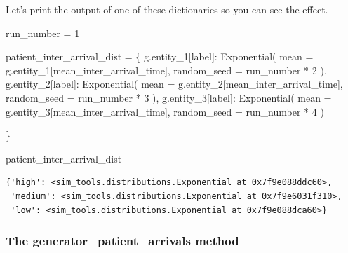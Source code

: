 \documentclass[
  letterpaper,
  DIV=11,
  numbers=noendperiod]{scrreprt}
\newenvironment{Shaded}{}{}
\newcommand{\DecValTok}[1]{\textcolor[rgb]{0.00,0.36,0.77}{#1}}
\newcommand{\NormalTok}[1]{\textcolor[rgb]{0.14,0.16,0.18}{#1}}
\newcommand{\OperatorTok}[1]{\textcolor[rgb]{0.14,0.16,0.18}{#1}}
\newcommand{\StringTok}[1]{\textcolor[rgb]{0.01,0.18,0.38}{#1}}
\begin{document}
Let's print the output of one of these dictionaries so you can see the
effect.

\begin{Shaded}
\begin{Highlighting}[]
\NormalTok{run\_number }\OperatorTok{=} \DecValTok{1}

\NormalTok{patient\_inter\_arrival\_dist }\OperatorTok{=}\NormalTok{ \{}
\NormalTok{            g.entity\_1[}\StringTok{\textquotesingle{}label\textquotesingle{}}\NormalTok{]: Exponential(}
\NormalTok{                mean }\OperatorTok{=}\NormalTok{ g.entity\_1[}\StringTok{\textquotesingle{}mean\_inter\_arrival\_time\textquotesingle{}}\NormalTok{],}
\NormalTok{                random\_seed }\OperatorTok{=}\NormalTok{ run\_number }\OperatorTok{*} \DecValTok{2}
\NormalTok{                ),}
\NormalTok{            g.entity\_2[}\StringTok{\textquotesingle{}label\textquotesingle{}}\NormalTok{]: Exponential(}
\NormalTok{                mean }\OperatorTok{=}\NormalTok{ g.entity\_2[}\StringTok{\textquotesingle{}mean\_inter\_arrival\_time\textquotesingle{}}\NormalTok{],}
\NormalTok{                random\_seed }\OperatorTok{=}\NormalTok{ run\_number }\OperatorTok{*} \DecValTok{3}
\NormalTok{                ),}
\NormalTok{            g.entity\_3[}\StringTok{\textquotesingle{}label\textquotesingle{}}\NormalTok{]: Exponential(}
\NormalTok{                mean }\OperatorTok{=}\NormalTok{ g.entity\_3[}\StringTok{\textquotesingle{}mean\_inter\_arrival\_time\textquotesingle{}}\NormalTok{],}
\NormalTok{                random\_seed }\OperatorTok{=}\NormalTok{ run\_number }\OperatorTok{*} \DecValTok{4}
\NormalTok{                )}

\NormalTok{        \}}

\NormalTok{patient\_inter\_arrival\_dist}
\end{Highlighting}
\end{Shaded}

\begin{verbatim}
{'high': <sim_tools.distributions.Exponential at 0x7f9e088ddc60>,
 'medium': <sim_tools.distributions.Exponential at 0x7f9e6031f310>,
 'low': <sim_tools.distributions.Exponential at 0x7f9e088dca60>}
\end{verbatim}

\subsubsection{The generator\_patient\_arrivals
method}\label{the-generator_patient_arrivals-method-1}
\end{document}
